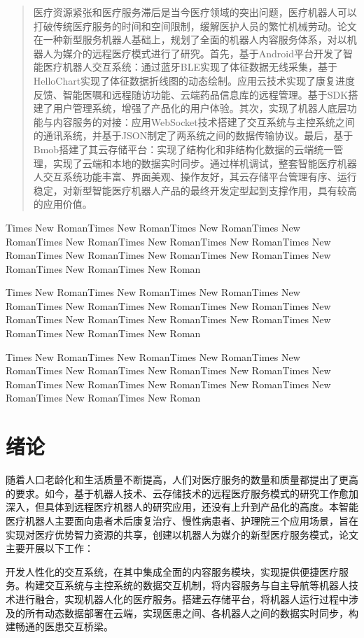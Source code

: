 \documentclass[UTF8,bachelor]{XJTUthesis}
\begin{document}

\tableofcontents
\thispagestyle{empty}
\setcounter{page}{0}
\newpage

\begin{abstract}
医疗资源紧张和医疗服务滞后是当今医疗领域的突出问题，医疗机器人可以打破传统医疗服务的时间和空间限制，缓解医护人员的繁忙机械劳动。论文在一种新型服务机器人基础上，规划了全面的机器人内容服务体系，对以机器人为媒介的远程医疗模式进行了研究。首先，基于Android平台开发了智能医疗机器人交互系统：通过蓝牙BLE实现了体征数据无线采集，基于HelloChart实现了体征数据折线图的动态绘制。应用云技术实现了康复进度反馈、智能医嘱和远程随访功能、云端药品信息库的远程管理。基于SDK搭建了用户管理系统，增强了产品化的用户体验。其次，实现了机器人底层功能与内容服务的对接：应用WebSocket技术搭建了交互系统与主控系统之间的通讯系统，并基于JSON制定了两系统之间的数据传输协议。最后，基于Bmob搭建了其云存储平台：实现了结构化和非结构化数据的云端统一管理，实现了云端和本地的数据实时同步。通过样机调试，整套智能医疗机器人交互系统功能丰富、界面美观、操作友好，其云存储平台管理有序、运行稳定，对新型智能医疗机器人产品的最终开发定型起到支撑作用，具有较高的应用价值。
\end{abstract}
\newpage
\begin{eabstract}
Times New RomanTimes New RomanTimes New RomanTimes New RomanTimes New RomanTimes New RomanTimes New RomanTimes New RomanTimes New RomanTimes New RomanTimes New RomanTimes New RomanTimes New RomanTimes New Roman\par
Times New RomanTimes New RomanTimes New RomanTimes New RomanTimes New RomanTimes New RomanTimes New RomanTimes New RomanTimes New RomanTimes New RomanTimes New RomanTimes New RomanTimes New RomanTimes New Roman\par
Times New RomanTimes New RomanTimes New RomanTimes New RomanTimes New RomanTimes New RomanTimes New RomanTimes New RomanTimes New RomanTimes New RomanTimes New RomanTimes New RomanTimes New RomanTimes New Roman\par
\end{eabstract}

\section{绪论}
随着人口老龄化和生活质量不断提高，人们对医疗服务的数量和质量都提出了更高的要求。如今，基于机器人技术、云存储技术的远程医疗服务模式的研究工作愈加深入，但具体到远程医疗机器人的研究应用，还没有上升到产品化的高度。本智能医疗机器人主要面向患者术后康复治疗、慢性病患者、护理院三个应用场景，旨在实现对医疗优势智力资源的共享，创建以机器人为媒介的新型医疗服务模式，论文主要开展以下工作：\par
开发人性化的交互系统，在其中集成全面的内容服务模块，实现提供便捷医疗服务。构建交互系统与主控系统的数据交互机制，将内容服务与自主导航等机器人技术进行融合，实现机器人化的医疗服务。搭建云存储平台，将机器人运行过程中涉及的所有动态数据部署在云端，实现医患之间、各机器人之间的数据实时同步，构建畅通的医患交互桥梁。\par
\end{document}
